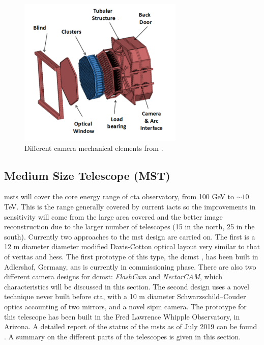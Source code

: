 \documentclass[main.tex]{subfiles}
\begin{document}
\begin{figure}
\centering
 \includegraphics[width=0.7\textwidth]{Pictures/LSTcamerastructure.pdf}
  \caption{Different camera mechanical elements from \cite{2013LSTCamMech}.}
    \label{fig:LSTcammech}
\end{figure}

\subsection{Medium Size Telescope (MST)} \label{sec:MST}

\glspl{mst} will cover the core energy range of \gls{cta} observatory, from 100 GeV to $\sim 10$TeV. This is the range generally covered  by current \glspl{iact} so the improvements in sensitivity will come from the large area covered and the better image reconstruction due to the larger number of telescopes (15 in the north, 25 in the south).
Currently two approaches to the \gls{mst} design are carried on. The first is a 12 m diameter diameter modified Davis-Cotton optical layout very similar to that of \gls{veritas} and \gls{hess}. The first prototype of this type, the \gls{dcmst} \cite{2017SCMSTstatus}, has been built in Adlershof, Germany, ans is currently in commissioning phase. There are also two different camera designs for \gls{dcmst}: \textit{FlashCam} and \textit{NectarCAM}, which characteristics will be discussed in this section.
The second design uses a novel technique never built before \gls{cta}, with a 10 m diameter Schwarzschild–Couder \cite{2017SCMSTstatus} optics accounting of two mirrors, and a novel \gls{sipm} camera. The prototype for this telescope has been built in the Fred Lawrence Whipple Observatory, in Arizona. 
A detailed report of the status of the \glspl{mst} as of July 2019 can be found \cite{2019MSTreport}. A summary on the different parts of the telescopes is given in this section.
\end{document}
